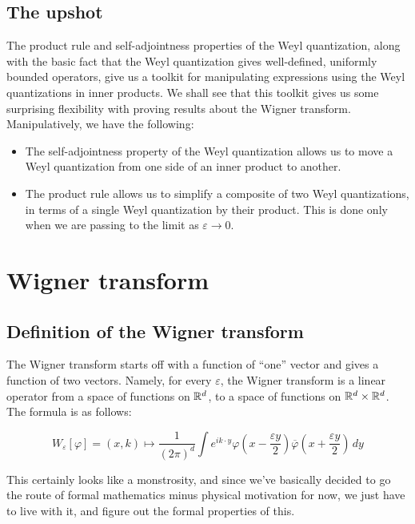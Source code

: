 \documentclass[a4paper]{amsart}
\begin{document}
\subsection{The upshot}

The product rule and self-adjointness properties of the Weyl
quantization, along with the basic fact that the Weyl quantization
gives well-defined, uniformly bounded operators, give us a toolkit for
manipulating expressions using the Weyl quantizations in inner
products.  We shall see that this toolkit gives us some surprising
flexibility with proving results about the Wigner transform. Manipulatively, we have the following:

\begin{itemize}

\item The self-adjointness property of the Weyl quantization allows us
  to move a Weyl quantization from one side of an inner product to
  another.

\item The product rule allows us to simplify a composite of two Weyl
  quantizations, in terms of a single Weyl quantization by their
  product. This is done only when we are passing to the limit as
  $\varepsilon \to 0$.

\end{itemize}


\section{Wigner transform}

\subsection{Definition of the Wigner transform}

The Wigner transform starts off with a function of ``one'' vector and
gives a function of two vectors. Namely, for every $\varepsilon$, the
Wigner transform is a linear operator from a space of functions on
$\mathbb{R}^d$, to a space of functions on $\mathbb{R}^d \times \mathbb{R}^d$. The formula is
as follows:

$$W_\varepsilon[\varphi] = (x,k) \mapsto \frac{1}{(2\pi)^d} \int e^{ik\cdot y} \varphi\left(x  - \frac{\varepsilon y}{2} \right) \overline{\varphi}\left(x + \frac{\varepsilon y}{2}\right) \, dy$$

This certainly looks like a monstrosity, and since we've basically
decided to go the route of formal mathematics minus physical
motivation for now, we just have to live with it, and figure out the
formal properties of this. 
\end{document}
